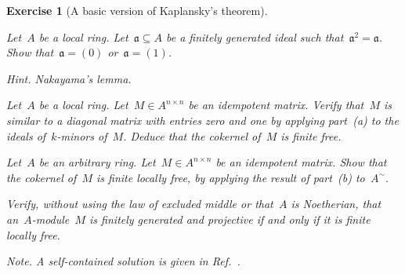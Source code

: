\documentclass{ws-rv9x6}
\newtheorem{ex}{Exercise}
\newenvironment{exercise}[1]{
  \begin{ex}[#1]
}{\end{ex}}
\newcommand{\aaa}{\mathfrak{a}}
\renewcommand{\_}{\mathpunct{.}}
\newcommand{\?}{\,{:}\,}
\begin{document}
\begin{exercise}{A basic version of Kaplansky's theorem}
\begin{alphlist}[(c)]
\item Let~$A$ be a local ring. Let~$\aaa \subseteq A$ be a finitely generated
ideal such that~$\aaa^2 = \aaa$. Show that~$\aaa = (0)$ or~$\aaa = (1)$.\smallskip

{\scriptsize\emph{Hint.} Nakayama's lemma.\par}
\item Let~$A$ be a local ring. Let~$M \in A^{n \times n}$ be an idempotent
matrix. Verify that~$M$ is similar to a diagonal matrix with entries zero and
one by applying part~(a) to the ideals of~$k$-minors of~$M$. Deduce that the
cokernel of~$M$ is finite free.
\item Let~$A$ be an arbitrary ring. Let~$M \in A^{n \times n}$ be an idempotent
matrix. Show that the cokernel of~$M$ is finite locally free, by applying the
result of part~(b) to~$A^\sim$.
\item Verify, without using the law of excluded middle or that~$A$ is
Noetherian, that an~$A$-module~$M$ is finitely generated and projective if and
only if it is finite locally free.\smallskip

{\scriptsize\emph{Note.} A self-contained solution is given in
Ref.~.\par}
\end{alphlist}
\end{exercise}



\end{document}
